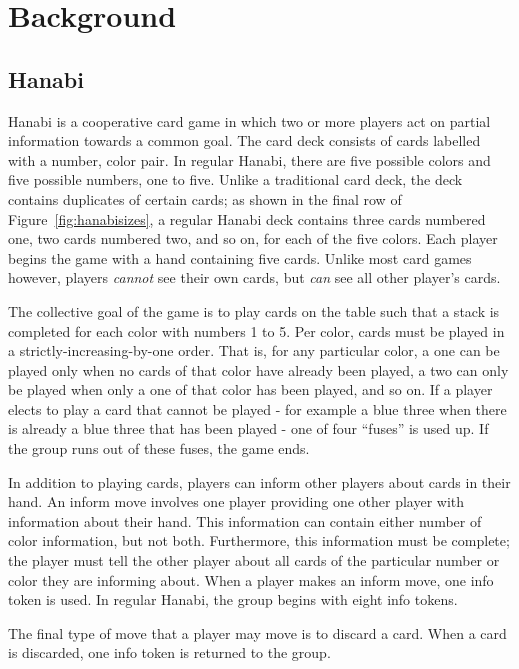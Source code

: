 \section{Background}
\label{sec:background}

\subsection{Hanabi}
\label{sec:background:hanabi}

Hanabi \cite{hanabiboardgame, hanabiwiki} is a cooperative card game in which
two or more players act on partial information towards a common goal. The
card deck consists of cards labelled with a number, color pair. In regular
Hanabi, there are five possible colors and five possible numbers, one to five.
Unlike a traditional card deck, the deck contains duplicates of certain cards;
as shown in the final row of Figure~\ref{fig:hanabisizes}, a regular Hanabi
deck contains three cards numbered one, two cards numbered two, and so on, for
each of the five colors. Each player begins the game with a hand containing
five cards. Unlike most card games however, players \emph{cannot} see their
own cards, but \emph{can} see all other player's cards.

The collective goal of the game is to play cards on the table such that a stack
is completed for each color with numbers 1 to 5. Per color, cards must be
played in a strictly-increasing-by-one order. That is, for any particular
color, a one can be played only when no cards of that color have already been
played, a two can only be played when only a one of that color has been played,
and so on.  If a player elects to play a card that cannot be played - for
example a blue three when there is already a blue three that has been played
- one of four ``fuses'' is used up. If the group runs out of these fuses, the
game ends.

In addition to playing cards, players can inform other players about cards
in their hand. An inform move involves one player providing one other player
with information about their hand. This information can contain either number
of color information, but not both. Furthermore, this information must be complete;
the player must tell the other player about all cards of the particular number or
color they are informing about. When a player makes an inform move, one info
token is used. In regular Hanabi, the group begins with eight info tokens.

The final type of move that a player may move is to discard a card. When a card
is discarded, one info token is returned to the group.

